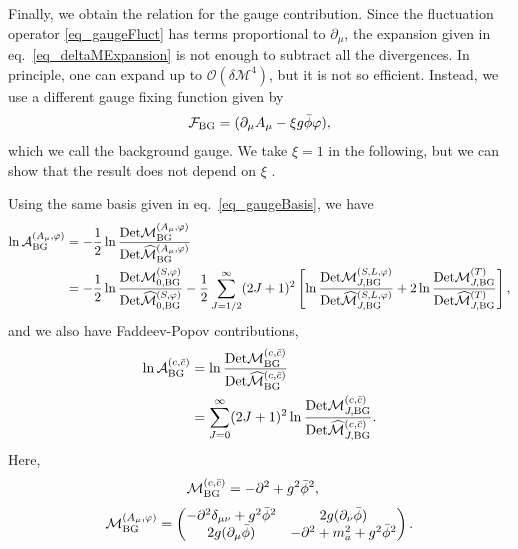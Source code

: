 \documentclass[12pt]{article}
\begin{document}
Finally, we obtain the relation for the gauge contribution.  Since the
fluctuation operator \eqref{eq_gaugeFluct} has terms proportional to
$\partial_\mu$, the expansion given in eq.~\eqref{eq_deltaMExpansion}
is not enough to subtract all the divergences. In principle, one can
expand up to $\mathcal O(\delta \mathcal M^4)$, but it is not so
efficient. Instead, we use a different gauge fixing function given by
\begin{align}
 \mathcal F_{\rm BG} = (\partial_\mu A_\mu-\xi g\bar\phi\varphi),
\end{align}
which we call the background gauge. We take $\xi = 1$ in the
following, but we can show that the result does not depend on $\xi$
\cite{????}.

Using the same basis given in eq.~\eqref{eq_gaugeBasis}, we have
\begin{align}
 \ln\mathcal A_{\rm BG}^{(A_\mu,\varphi)}
  & = -\frac{1}{2}
 \ln\frac{\det\mathcal M^{(A_\mu,\varphi)}_{\rm BG}}
 {\det\widehat{\mathcal M}^{(A_\mu,\varphi)}_{\rm BG}} \\
  & = -\frac{1}{2}
 \ln\frac{\det\mathcal M^{(S,\varphi)}_{0,\rm BG}}
 {\det\widehat{\mathcal M}^{(S,\varphi)}_{0,\rm BG}}
 -\frac{1}{2}\sum_{J=1/2}^{\infty}(2J+1)^2
 \left[
  \ln\frac{\det\mathcal M^{(S,L,\varphi)}_{J,\rm BG}}
  {\det\widehat{\mathcal M}^{(S,L,\varphi)}_{J,\rm BG}}
  +2\ln\frac{\det\mathcal M^{(T)}_{J,\rm BG}}
  {\det\widehat{\mathcal M}^{(T)}_{J,\rm BG}}
 \right],
\end{align}
and we also have Faddeev-Popov contributions,
\begin{align}
 \ln\mathcal A_{\rm BG}^{(c,\bar{c})}
  & = \ln\frac{\det\mathcal M^{(c,\bar{c})}_{\rm BG}}
 {\det\widehat{\mathcal M}^{(c,\bar{c})}_{\rm BG}}    \\
  & = \sum_{J=0}^{\infty}(2J+1)^2
 \ln\frac{\det\mathcal M^{(c,\bar{c})}_{J,\rm BG}}
 {\det\widehat{\mathcal M}^{(c,\bar{c})}_{J,\rm BG}}.
\end{align}
Here,
\begin{align}
 \mathcal M^{(c,\bar{c})}_{\rm BG} & = -\partial^2+g^2\bar\phi^2,
\end{align}
\begin{align}
 \mathcal M^{(A_\mu,\varphi)}_{\rm BG} =
 \begin{pmatrix}
  -\partial^2\delta_{\mu\nu}+g^2\bar\phi^2 & 2g(\partial_\nu\bar\phi)          \\
  2g(\partial_\mu\bar\phi)                 & -\partial^2+m_{a}^2+g^2\bar\phi^2
 \end{pmatrix}.
\end{align}
\end{document}
